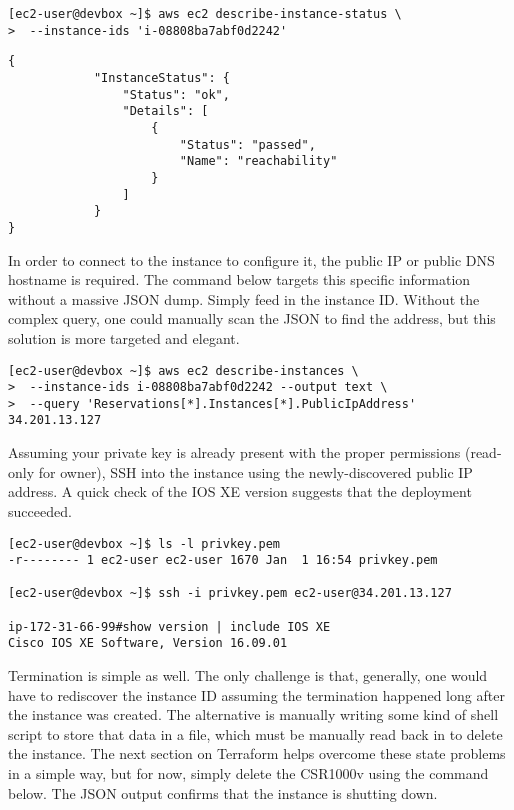 \begin{verbatim}
[ec2-user@devbox ~]$ aws ec2 describe-instance-status \
>  --instance-ids 'i-08808ba7abf0d2242'
\end{verbatim}

\begin{verbatim}
{
            "InstanceStatus": {
                "Status": "ok", 
                "Details": [
                    {
                        "Status": "passed", 
                        "Name": "reachability"
                    }
			    ]
            }
}
\end{verbatim}

In order to connect to the instance to configure it, the public IP or public
DNS hostname is required. The command below targets this specific information
without a massive JSON dump. Simply feed in the instance ID\@. Without the
complex query, one could manually scan the JSON to find the address, but this
solution is more targeted and elegant.

\begin{verbatim}
[ec2-user@devbox ~]$ aws ec2 describe-instances \
>  --instance-ids i-08808ba7abf0d2242 --output text \
>  --query 'Reservations[*].Instances[*].PublicIpAddress' 
34.201.13.127
\end{verbatim}

Assuming your private key is already present with the proper permissions
(read-only for owner), SSH into the instance using the newly-discovered public
IP address. A quick check of the IOS XE version suggests that the deployment
succeeded.

\begin{verbatim}
[ec2-user@devbox ~]$ ls -l privkey.pem 
-r-------- 1 ec2-user ec2-user 1670 Jan  1 16:54 privkey.pem

[ec2-user@devbox ~]$ ssh -i privkey.pem ec2-user@34.201.13.127

ip-172-31-66-99#show version | include IOS XE
Cisco IOS XE Software, Version 16.09.01
\end{verbatim}

Termination is simple as well. The only challenge is that, generally, one
would have to rediscover the instance ID assuming the termination happened
long after the instance was created. The alternative is manually writing some
kind of shell script to store that data in a file, which must be manually read
back in to delete the instance. The next section on Terraform helps overcome
these state problems in a simple way, but for now, simply delete the CSR1000v
using the command below. The JSON output confirms that the instance is
shutting down.

